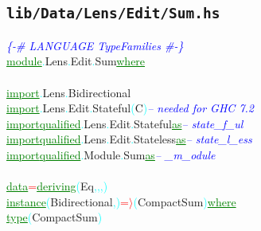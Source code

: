 \subsection{\texttt{lib/Data/Lens/Edit/Sum.hs}}
\label{mod:Data.Lens.Edit.Sum}
\textcolor{blue}{{\it{}\{-\# LANGUAGE TypeFamilies \#-\}}}\\\textcolor{green}{\underline{module}}\textcolor{cyan}{.}{\rm{}Lens}\textcolor{cyan}{.}{\rm{}Edit}\textcolor{cyan}{.}{\rm{}Sum}\hsspace \textcolor{green}{\underline{where}}\\\\\textcolor{green}{\underline{import}}\textcolor{cyan}{.}{\rm{}Lens}\textcolor{cyan}{.}{\rm{}Bidirectional}\\\textcolor{green}{\underline{import}}\textcolor{cyan}{.}{\rm{}Lens}\textcolor{cyan}{.}{\rm{}Edit}\textcolor{cyan}{.}{\rm{}Stateful}\hsspace \textcolor{cyan}{(}{\rm{}C}\textcolor{cyan}{)}\hsspace \textcolor{blue}{{\it{}-- needed for GHC 7.2}}\\\textcolor{green}{\underline{import}}\hsspace \textcolor{green}{\underline{qualified}}\textcolor{cyan}{.}{\rm{}Lens}\textcolor{cyan}{.}{\rm{}Edit}\textcolor{cyan}{.}{\rm{}Stateful}\hsspace \hsspace \textcolor{green}{\underline{as}}\hsspace \textcolor{blue}{{\it{}-- state\_f\_ul}}\\\textcolor{green}{\underline{import}}\hsspace \textcolor{green}{\underline{qualified}}\textcolor{cyan}{.}{\rm{}Lens}\textcolor{cyan}{.}{\rm{}Edit}\textcolor{cyan}{.}{\rm{}Stateless}\hsspace \textcolor{green}{\underline{as}}\hsspace \textcolor{blue}{{\it{}-- state\_l\_ess}}\\\textcolor{green}{\underline{import}}\hsspace \textcolor{green}{\underline{qualified}}\textcolor{cyan}{.}{\rm{}Module}\textcolor{cyan}{.}{\rm{}Sum}\hsspace \hsspace \hsspace \hsspace \hsspace \hsspace \hsspace \hsspace \hsspace \hsspace \textcolor{green}{\underline{as}}\hsspace \textcolor{blue}{{\it{}-- \_m\_odule}}\\\\\textcolor{green}{\underline{data}}\hsspace \textcolor{red}{=}\hsspace \textcolor{green}{\underline{deriving}}\hsspace \textcolor{cyan}{(}{\rm{}Eq}\textcolor{cyan}{,}\textcolor{cyan}{,}\textcolor{cyan}{,}\textcolor{cyan}{)}\\\textcolor{green}{\underline{instance}}\hsspace \textcolor{cyan}{(}{\rm{}Bidirectional}\textcolor{cyan}{,}\textcolor{cyan}{)}\hsspace \textcolor{red}{=\ensuremath{\rangle}}\hsspace \textcolor{cyan}{(}{\rm{}CompactSum}\textcolor{cyan}{)}\hsspace \textcolor{green}{\underline{where}}\\\hstab \textcolor{green}{\underline{type}}\hsspace \textcolor{cyan}{(}{\rm{}CompactSum}\textcolor{cyan}{)}\hsspace 